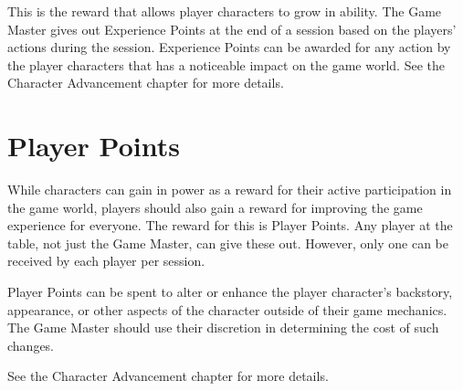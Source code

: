 \begin{multicols}{2}
This is the reward that allows player characters to grow in ability. The Game Master gives 
out Experience Points at the end of a session based on the players' actions during the 
session. Experience Points can be awarded for any action by the player characters that 
has a noticeable impact on the game world. See the Character Advancement chapter for
more details.

\section{Player Points}

While characters can gain in power as a reward for their active participation in the game 
world, players should also gain a reward for improving the game experience for everyone. 
The reward for this is Player Points. Any player at the table, not just the Game Master, 
can give these out. However, only one can be received by each player per session.

Player Points can be spent to alter or enhance the player character's backstory, appearance, 
or other aspects of the character outside of their game mechanics. The Game Master should 
use their discretion in determining the cost of such changes.

See the Character Advancement chapter for more details.

\end{multicols}
